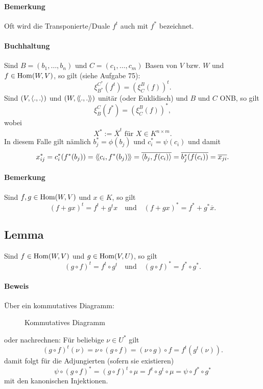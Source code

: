 \paragraph{Bemerkung}
	Oft wird die Transponierte/Duale $ f^t $ auch mit $ f^* $ bezeichnet.
\paragraph{Buchhaltung}
	Sind $ B=(b_1,\dots,b_n) $ und $ C=(c_1,\dots,c_m) $ Basen von $ V $ bzw. $ W $ und $ f\in \operatorname{Hom}(W,V) $, so gilt (siehe Aufgabe 75):
		\[ \xi_{B^*}^{C^*}(f^t) = \left(\xi_C^B(f)\right)^t. \]
	Sind $ (V,\langle .,. \rangle) $ und $ (W,\langle\! \langle .,. \rangle\! \rangle) $ unitär (oder Euklidisch) und $ B$ und $C $ ONB, so gilt
		\[ \xi_B^C(f^*) = \left(\xi_C^B(f)\right)^*, \]
	wobei 
		\[ X^*:= \overline{X}^t \text{ für } X\in K^{n\times m}. \]
	In diesem Falle gilt nämlich $ b_j^*=\phi(b_j) $ und $ c_i^* = \psi(c_i) $ und damit
		\[ x_{ij}^* = c_i^*(f^*(b_j)) = \langle\! \langle c_i,f^*(b_j) \rangle\! \rangle = \overline{\langle b_j,f(c_i) \rangle} =\overline{b_j^*(f(c_i))}= \overline{x_{ji}}. \]
\paragraph{Bemerkung}
	Sind $ f,g \in \operatorname{Hom}(W,V)$ und $ x\in K $, so gilt
		\[ (f+gx)^t = f^t+g^tx \quad\text{und}\quad (f+gx)^* = f^*+g^*\overline{x}. \]
		
\subsection{Lemma}
\begin{Lemma}
	Sind $ f\in \operatorname{Hom}(W,V) $ und $ g\in \operatorname{Hom}(V,U) $, so gilt
		\[ (g\circ f)^t = f^t \circ g^t \quad\text{und}\quad (g\circ f)^* = f^* \circ g^*. \]
\end{Lemma}
\paragraph{Beweis}
	Über ein kommutatives Diagramm:
     	\begin{figure}[h]\centering
     		
     		\caption{Kommutatives Diagramm}
    	\end{figure}\noindent
	oder nachrechnen:
	Für beliebige $ \nu \in U^* $ gilt
		\[ (g\circ f)^t(\nu) = \nu \circ (g\circ f) = (\nu \circ g)\circ f = f^t(g^t(\nu)). \]	
	damit folgt für die Adjungierten (sofern sie existieren)
		\[ \psi \circ (g\circ f)^* = (g\circ f)^t \circ \mu = f^t\circ g^t \circ \mu = \psi \circ f^*\circ g^* \]
	mit den kanonischen Injektionen.

